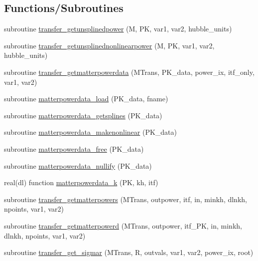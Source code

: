 \subsection*{Functions/\+Subroutines}
\begin{DoxyCompactItemize}
\item 
subroutine \mbox{\hyperlink{namespacetransfer_af736a104130d0ba0ffbadfa62d245747}{transfer\+\_\+getunsplinedpower}} (M, PK, var1, var2, hubble\+\_\+units)
\item 
subroutine \mbox{\hyperlink{namespacetransfer_a8690f3749fa31715c7729f1f934b7d91}{transfer\+\_\+getunsplinednonlinearpower}} (M, PK, var1, var2, hubble\+\_\+units)
\item 
subroutine \mbox{\hyperlink{namespacetransfer_a149c7870c28cd849591073c3d8f76d69}{transfer\+\_\+getmatterpowerdata}} (M\+Trans, P\+K\+\_\+data, power\+\_\+ix, itf\+\_\+only, var1, var2)
\item 
subroutine \mbox{\hyperlink{namespacetransfer_af9f31cacfbd0270f60f1c42a0b38dd62}{matterpowerdata\+\_\+load}} (P\+K\+\_\+data, fname)
\item 
subroutine \mbox{\hyperlink{namespacetransfer_ad195947cd911f4aef6edba0319f4ac2f}{matterpowerdata\+\_\+getsplines}} (P\+K\+\_\+data)
\item 
subroutine \mbox{\hyperlink{namespacetransfer_a113eb04b73dbf4222ca5a7e88eea5528}{matterpowerdata\+\_\+makenonlinear}} (P\+K\+\_\+data)
\item 
subroutine \mbox{\hyperlink{namespacetransfer_aca3eef4bfa07144ae4db1ec793e42c70}{matterpowerdata\+\_\+free}} (P\+K\+\_\+data)
\item 
subroutine \mbox{\hyperlink{namespacetransfer_a890cb72b18bbeb6b973f55ac477250e2}{matterpowerdata\+\_\+nullify}} (P\+K\+\_\+data)
\item 
real(dl) function \mbox{\hyperlink{namespacetransfer_a7d7e2b6a55941b8e40b01b2cfed0af02}{matterpowerdata\+\_\+k}} (PK, kh, itf)
\item 
subroutine \mbox{\hyperlink{namespacetransfer_a4515b492b259544eae13a774663d6cea}{transfer\+\_\+getmatterpowers}} (M\+Trans, outpower, itf, in, minkh, dlnkh, npoints, var1, var2)
\item 
subroutine \mbox{\hyperlink{namespacetransfer_aec77f610696b7445e8c8e070491ca238}{transfer\+\_\+getmatterpowerd}} (M\+Trans, outpower, itf\+\_\+\+PK, in, minkh, dlnkh, npoints, var1, var2)
\item 
subroutine \mbox{\hyperlink{namespacetransfer_a0b068265a029b16713e45ff26d8e6794}{transfer\+\_\+get\+\_\+sigmar}} (M\+Trans, R, outvals, var1, var2, power\+\_\+ix, root)

\end{DoxyCompactItemize}
